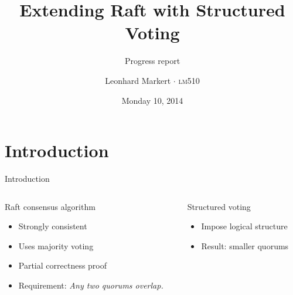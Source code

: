 \documentclass{beamer}
\title{Extending Raft with Structured Voting}
\subtitle{Progress report}
\author{Leonhard Markert \(\cdot\) \textsc{lm510}}
\date{Monday 10, 2014}
\begin{document}

\begin{frame}
    \titlepage
\end{frame}


\section{Introduction}
\begin{frame}{Introduction}
    \begin{columns}[t]
        \begin{column}{.47\textwidth}
            \begin{block}{Raft consensus algorithm}
                \begin{itemize}
                    \item Strongly consistent
                    \item Uses majority voting
                    \item Partial correctness proof
                    \item Requirement: \emph{Any two quorums overlap.}
                \end{itemize}
            \end{block}
        \end{column}
        \begin{column}{.53\textwidth}
            \begin{block}{Structured voting}
                \begin{itemize}
                    \item Impose logical structure
                    \item Result: smaller quorums
                \end{itemize}


\end{block}
\end{column}
\end{columns}
\end{frame}
\end{document}

